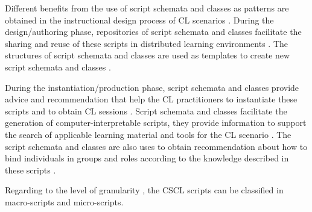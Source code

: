 Different benefits from the use of script schemata and classes as patterns are obtained in the instructional design process of CL scenarios \cite{AlharbiAthaudaChiong2014, ChallcoBittencourtIsotani2016, MiaoHoeksemaHoppeHarrer2005}. During the design/authoring phase, repositories of script schemata and classes facilitate the sharing and reuse of these scripts in distributed learning environments \cite{PrietoAsensio-PerezMunoz-CristobalDimitriadisJorrin-AbellanGomez-Sanchez2013, PrietoTchounikineAsensio-PerezSobreiraDimitriadis2014}. The structures of script schemata and classes are used as templates to create new script schemata and classes \cite{AndreasHarrerH.UlrchHoppe2007, RonenKohen-Vacs2009}. 

During the instantiation/production phase, script schemata and classes provide advice and recommendation that help the CL practitioners to instantiate these scripts and to obtain CL sessions \cite{MagnisalisDemetriadis2012a, PrietoAsensio-PerezDimitriadisGomez-SanchezMunoz-Cristobal2011,Alario-HoyosBote-LorenzoGomez-SanchezAsensio-PerezVega-GorgojoRuiz-Calleja2013}. Script schemata and classes facilitate the generation of computer-interpretable scripts, they provide information to support the search of applicable learning material and tools for the CL scenario \cite{Bote-LorenzoVaquero-GonzalezVega-GorgojoDimitriadisAsensio-PerezGomez-SanchezHernandez-Leo2004, IsotaniMizoguchi2008a, Vega-GorgojoBote-LorenzoGomez-SanchezDimitriadisAsensio-Perez2005}. The script schemata and classes are also uses to obtain recommendation about how to bind individuals in groups and roles according to the knowledge described in these scripts \cite{IsotaniMizoguchiIsotaniCapeliIsotanideAlbuquerqueBittencourtJaques2013,Villasclaras-FernandezHernandez-GonzaloLeoAsensio-PerezDimitriadisMartinez-Mones2009}.

Regarding to the level of granularity \cite{FischerKollarStegmannWeckerZottmann2013}, the CSCL scripts can be classified in macro-scripts and micro-scripts.

